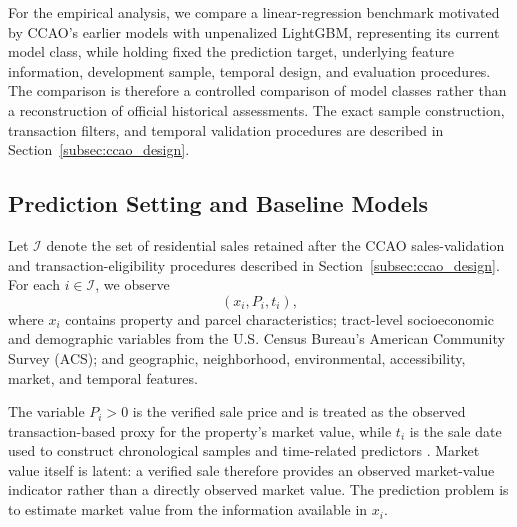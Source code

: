\documentclass[10pt]{article}
\theoremstyle{definition}
\newcommand{\1}{\mathbf{1}}
\begin{document}

{For the empirical analysis, we compare a linear-regression benchmark motivated by CCAO's earlier models with unpenalized LightGBM, representing its current model class, while holding fixed the prediction target, underlying feature information, development sample, temporal design, and evaluation procedures.}
The comparison is therefore a controlled comparison of model classes rather than a reconstruction of official historical assessments. The exact sample construction, transaction filters, and temporal validation procedures are described in Section~\ref{subsec:ccao_design}.


\subsection{Prediction Setting and Baseline Models}
\label{subsec:baseline_models}

Let $\mathcal{I}$ denote the set of residential sales retained after the CCAO sales-validation and transaction-eligibility procedures described in Section~\ref{subsec:ccao_design}. For each $i\in\mathcal{I}$, we observe
\[
(x_i,P_i,t_i),
\]
where $x_i$ contains property and parcel characteristics; tract-level socioeconomic and demographic variables from the U.S. Census Bureau's American Community Survey (ACS); and geographic, neighborhood, environmental, accessibility, market, and temporal features.


{The variable $P_i>0$ is the verified sale price and is treated as the observed transaction-based proxy for the property's market value, while $t_i$ is the sale date used to construct chronological samples and time-related predictors  \cite{CCAOModelResAVM2026,IAAO2026ExposureRatio}. Market value itself is latent: a verified sale therefore provides an observed market-value indicator rather than a directly observed market value.}
The prediction problem is to estimate market value from the information available in $x_i$.
\end{document}
